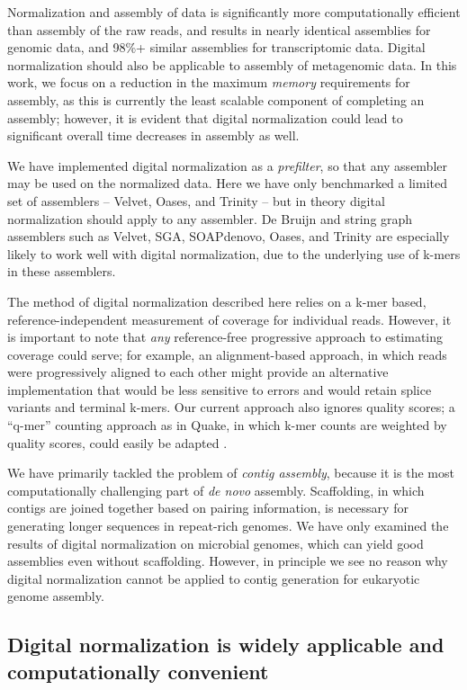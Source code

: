 \documentclass{pnastwo}
\begin{document}
\begin{article}
Normalization and assembly of data is significantly more
computationally efficient than assembly of the raw reads, and results
in nearly identical assemblies for genomic data, and 98\%+ similar
assemblies for transcriptomic data.  Digital normalization should also
be applicable to assembly of metagenomic data.  In this work, we focus
on a reduction in the maximum {\em memory} requirements for assembly,
as this is currently the least scalable component of completing an
assembly; however, it is evident that digital normalization could lead
to significant overall time decreases in assembly as well.

We have implemented digital normalization as a {\em prefilter}, so
that any assembler may be used on the normalized data.  Here we have
only benchmarked a limited set of assemblers -- Velvet, Oases, and
Trinity -- but in theory digital normalization should apply to any
assembler.  De Bruijn and string graph assemblers such as Velvet, SGA,
SOAPdenovo, Oases, and Trinity are especially likely to work well with
digital normalization, due to the underlying use of k-mers in these
assemblers.

The method of digital normalization described here relies on a k-mer
based, reference-independent measurement of coverage for individual
reads.  However, it is important to note that {\em any} reference-free
progressive approach to estimating coverage could serve; for example,
an alignment-based approach, in which reads were progressively aligned
to each other might provide an alternative implementation that would
be less sensitive to errors and would retain splice variants and
terminal k-mers.  Our current approach also ignores quality scores; a
``q-mer'' counting approach as in Quake, in which k-mer counts are
weighted by quality scores, could easily be adapted
\cite{pubmed21114842}.

We have primarily tackled the problem of {\em contig assembly},
because it is the most computationally challenging part of {\em de
  novo} assembly.  Scaffolding, in which contigs are joined together
based on pairing information, is necessary for generating longer
sequences in repeat-rich genomes.  We have only examined the results
of digital normalization on microbial genomes, which can yield good
assemblies even without scaffolding.  However, in principle we see no
reason why digital normalization cannot be applied to contig
generation for eukaryotic genome assembly.

\subsection{Digital normalization is widely applicable and computationally convenient}


\end{article}
\end{document}
